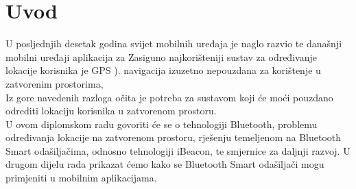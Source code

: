 \chapter{Uvod}
U posljednjih desetak godina svijet mobilnih uređaja je naglo razvio te današnji mobilni uređaji  aplikacija za 
Zasiguno najkorišteniji sustav za određivanje lokacije korisnika je GPS ).
navigacija izuzetno nepouzdana za korištenje u zatvorenim prostorima,  %
\\
Iz gore navedenih razloga očita je potreba za sustavom koji će moći pouzdano odrediti lokaciju korisnika u zatvorenom prostoru.
\\
U ovom diplomskom radu govoriti će se o tehnologiji Bluetooth, problemu određivanja lokacije na zatvorenom prostoru, rješenju temeljenom na Bluetooth Smart odašiljačima, odnosno tehnologiji iBeacon, te smjernice za daljnji razvoj. U drugom dijelu rada prikazat ćemo kako se Bluetooth Smart odašiljači mogu primjeniti u mobilnim aplikacijama.